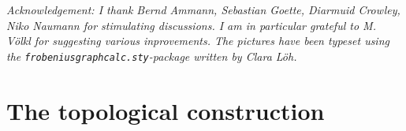 \documentclass[12pt]{article}
\begin{document}
\bigskip














 

  



{\it Acknowledgement: I thank Bernd Ammann, Sebastian Goette,  Diarmuid Crowley,   Niko Naumann for stimulating discussions. I am in particular grateful to M. V\"olkl for suggesting various inprovements. 
The pictures have been typeset using the {\tt frobeniusgraphcalc.sty}-package written by Clara L\"oh.}




\section{The topological construction}\label{sec2222}

 
\end{document}
